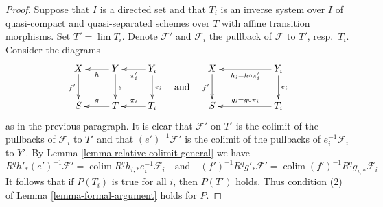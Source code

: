 \documentclass{amsart}
\theoremstyle{plain}
\theoremstyle{definition}
\theoremstyle{remark}
\numberwithin{equation}{subsection}
\def\lim{\mathop{\mathrm{lim}}\nolimits}
\def\colim{\mathop{\mathrm{colim}}\nolimits}
\begin{document}
\begin{proof}
\medskip\noindent
Suppose that $I$ is a directed set and that $T_i$
is an inverse system over $I$ of quasi-compact and quasi-separated
schemes over $T$ with affine transition morphisms.
Set $T' = \lim T_i$. Denote $\mathcal{F}'$ and $\mathcal{F}_i$
the pullback of $\mathcal{F}$ to $T'$, resp.\ $T_i$. Consider
the diagrams
$$
\vcenter{
\xymatrix{
X \ar[d]_{f'} & Y \ar[l]^h \ar[d]^e & Y_i \ar[l]^{\pi_i'} \ar[d]^{e_i} \\
S & T \ar[l]_g & T_i \ar[l]_{\pi_i}
}
}
\quad\text{and}\quad
\vcenter{
\xymatrix{
X \ar[d]_{f'} & & Y_i \ar[ll]^{h_i = h \circ \pi_i'} \ar[d]^{e_i} \\
S & & T_i \ar[ll]_{g_i = g \circ \pi_i}
}
}
$$
as in the previous paragraph. It is clear that $\mathcal{F}'$ on
$T'$ is the colimit of the pullbacks of $\mathcal{F}_i$ to $T'$
and that $(e')^{-1}\mathcal{F}'$ is the colimit of the pullbacks
of $e_i^{-1}\mathcal{F}_i$ to $Y'$.
By Lemma \ref{lemma-relative-colimit-general}
we have
$$
R^qh'_*(e')^{-1}\mathcal{F}' = \colim R^qh_{i, *}e_i^{-1}\mathcal{F}_i
\quad\text{and}\quad
(f')^{-1}R^qg'_*\mathcal{F}' = \colim (f')^{-1}R^qg_{i, *}\mathcal{F}_i
$$
It follows that if $P(T_i)$ is true for all $i$, then
$P(T')$ holds. Thus condition (2) of Lemma \ref{lemma-formal-argument}
holds for $P$.


\end{proof}
\end{document}
